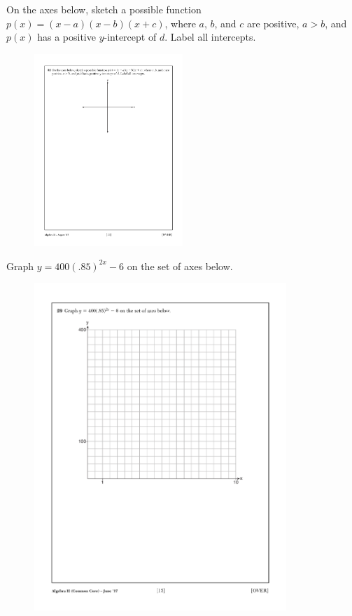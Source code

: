\item  %
On the axes below, sketch a possible function $p(x) =(x - a)(x -   b)(x + c)$, 
where $a$, $b$, and $c$ are positive, $a > b$, and $p(x)$ has a positive $y$-intercept of $d$. 
Label all intercepts.

\vspace{0.5 in}
\begin{figure}[!ht]
    \centering
    \includegraphics[width=0.5\textwidth]{simple-axes.pdf}
\end{figure}

\newpage %
\item  %
Graph $y =400(.85)^{2x} -6$ on the set of axes below.

\begin{figure}[!ht]
    \centering
    \includegraphics[width=0.85\textwidth]{1stQ-grid-special.pdf}
\end{figure}

